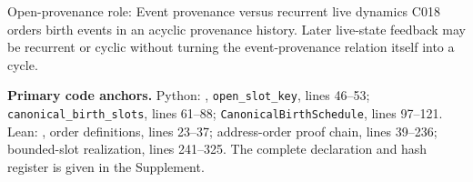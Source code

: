 \begin{cnnaInfoBox}{Open-provenance role: Event provenance versus recurrent live dynamics}
C018 orders birth events in an acyclic provenance history.  Later live-state feedback may be recurrent or cyclic without turning the event-provenance relation itself into a cycle.
\end{cnnaInfoBox}

\noindent\textbf{Primary code anchors.}
Python:
,
\texttt{open\_slot\_key}, lines 46--53; \texttt{canonical\_birth\_slots},
lines 61--88; \texttt{CanonicalBirthSchedule}, lines 97--121.  Lean:
,
order definitions, lines 23--37; address-order proof chain, lines 39--236;
bounded-slot realization, lines 241--325.  The complete declaration and hash
register is given in the Supplement.
